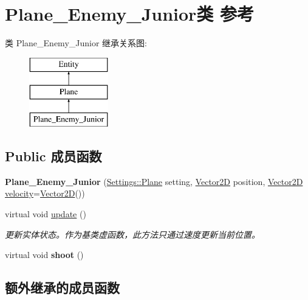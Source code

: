 \hypertarget{class_plane___enemy___junior}{}\section{Plane\+\_\+\+Enemy\+\_\+\+Junior类 参考}
\label{class_plane___enemy___junior}
类 Plane\+\_\+\+Enemy\+\_\+\+Junior 继承关系图\+:\begin{figure}[H]
\begin{center}
\leavevmode
\includegraphics[height=3.000000cm]{class_plane___enemy___junior}
\end{center}
\end{figure}
\subsection*{Public 成员函数}
\begin{DoxyCompactItemize}
\item 
\mbox{\label{class_plane___enemy___junior_a2a6b4a6903c05789e8be98d2d11a927d}} 
{\bfseries Plane\+\_\+\+Enemy\+\_\+\+Junior} (\hyperlink{struct_settings_1_1_plane}{Settings\+::\+Plane} setting, \hyperlink{structbasic__vector2_d}{Vector2D} position, \hyperlink{structbasic__vector2_d}{Vector2D} \hyperlink{class_entity_a386d25b56772b8913eb3e5adc636f6e0}{velocity}=\hyperlink{structbasic__vector2_d}{Vector2D}())
\item 
virtual void \hyperlink{class_plane___enemy___junior_a686e46c9927793dd07235cac72d52405}{update} ()
\begin{DoxyCompactList}\small\item\em 更新实体状态。作为基类虚函数，此方法只通过速度更新当前位置。 \end{DoxyCompactList}\item 
\mbox{\label{class_plane___enemy___junior_ac9c3559aa4616f1b1efbe4a055fca0ac}} 
virtual void {\bfseries shoot} ()
\end{DoxyCompactItemize}
\subsection*{额外继承的成员函数}


